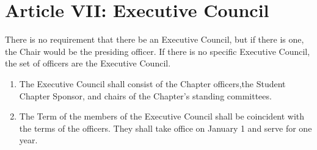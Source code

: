 \section*{Article VII: Executive Council}

There is no requirement that there be an Executive Council, but if there is one, the Chair would be the presiding officer.
If there is no specific Executive Council, the set of officers are the Executive Council.

\begin{enumerate}
    \item The Executive Council shall consist of the Chapter officers,the Student Chapter Sponsor, and chairs of the Chapter's standing committees.
    \item The Term of the members of the Executive Council shall be coincident with the terms of the officers.
    They shall take office on January 1 and serve for one year.
\end{enumerate}
